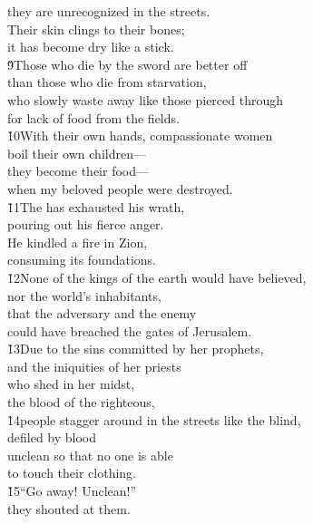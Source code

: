 \begin{poetry}
\poemll    they are unrecognized in the streets. \\
\poeml Their skin clings to their bones; \\
\poemll    it has become dry like a stick. \\
\poeml \v{9}Those who die by the sword are better off \\
\poemll    than those who die from starvation, \\
\poeml who slowly waste away like those pierced through \\
\poemll    for lack of food from the fields. \\
\poeml \v{10}With their own hands, compassionate women \\
\poemll    boil their own children--- \\
\poeml they become their food--- \\
\poemll    when my beloved people were destroyed. \\
\poeml \v{11}The  has exhausted his wrath, \\
\poemll    pouring out his fierce anger. \\
\poeml He kindled a fire in Zion, \\
\poemll    consuming its foundations. \\
\poeml \v{12}None of the kings of the earth would have believed, \\
\poemll    nor the world's inhabitants, \\
\poeml that the adversary and the enemy \\
\poemll    could have breached the gates of Jerusalem. \\
\poeml \v{13}Due to the sins committed by her prophets, \\
\poemll    and the iniquities of her priests \\
\poeml who shed in her midst, \\
\poemll    the blood of the righteous, \\
\poeml \v{14}people stagger around in the streets like the blind, \\
\poemll    defiled by blood \\
\poeml unclean so that no one is able \\
\poemll    to touch their clothing. \\
\poeml \v{15}``Go away! Unclean!'' \\
\poemll    they shouted at them. \\

\end{poetry}
